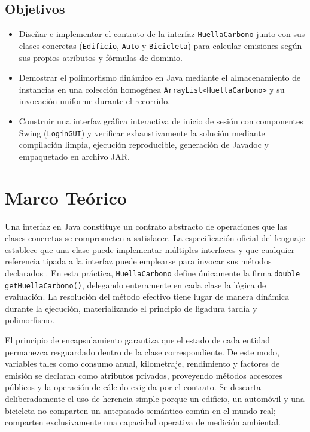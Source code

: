\documentclass[letterpaper,12pt,oneside]{article}
\numberwithin{figure}{section}
\begin{document}
\subsection{Objetivos}
\begin{itemize}
  \item Dise\~nar e implementar el contrato de la interfaz \texttt{HuellaCarbono} junto con sus clases concretas (\texttt{Edificio}, \texttt{Auto} y \texttt{Bicicleta}) para calcular emisiones seg\'un sus propios atributos y f\'ormulas de dominio.
  \item Demostrar el polimorfismo din\'amico en Java mediante el almacenamiento de instancias en una colecci\'on homog\'enea \texttt{ArrayList<HuellaCarbono>} y su invocaci\'on uniforme durante el recorrido.
  \item Construir una interfaz gr\'afica interactiva de inicio de sesi\'on con componentes Swing (\texttt{LoginGUI}) y verificar exhaustivamente la soluci\'on mediante compilaci\'on limpia, ejecuci\'on reproducible, generaci\'on de Javadoc y empaquetado en archivo JAR.
\end{itemize}

\section{Marco Te\'orico}

Una interfaz en Java constituye un contrato abstracto de operaciones que las clases concretas se comprometen a satisfacer. La especificaci\'on oficial del lenguaje establece que una clase puede implementar m\'ultiples interfaces y que cualquier referencia tipada a la interfaz puede emplearse para invocar sus m\'etodos declarados \cite{jls}. En esta pr\'actica, \texttt{HuellaCarbono} define \'unicamente la firma \texttt{double getHuellaCarbono()}, delegando enteramente en cada clase la l\'ogica de evaluaci\'on. La resoluci\'on del m\'etodo efectivo tiene lugar de manera din\'amica durante la ejecuci\'on, materializando el principio de ligadura tard\'ia y polimorfismo.

El principio de encapsulamiento garantiza que el estado de cada entidad permanezca resguardado dentro de la clase correspondiente. De este modo, variables tales como consumo anual, kilometraje, rendimiento y factores de emisi\'on se declaran como atributos privados, proveyendo m\'etodos accesores p\'ublicos y la operaci\'on de c\'alculo exigida por el contrato. Se descarta deliberadamente el uso de herencia simple porque un edificio, un autom\'ovil y una bicicleta no comparten un antepasado sem\'antico com\'un en el mundo real; comparten exclusivamente una capacidad operativa de medici\'on ambiental.
\end{document}
